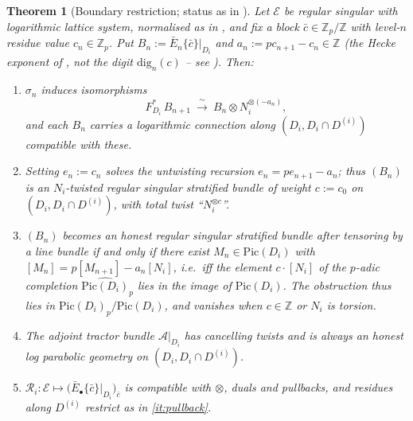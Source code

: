 \documentclass[11pt,reqno]{amsart}
\newcommand{\Zp}{\mathbb{Z}_p}
\newcommand{\ZZ}{\mathbb{Z}}
\newcommand{\cE}{\mathcal{E}}
\newcommand{\cA}{\mathcal{A}}
\newcommand{\cR}{\mathcal{R}}
\newcommand{\Pic}{\mathrm{Pic}}
\newcommand{\dig}{\mathrm{dig}}
\newcommand{\isoto}{\xrightarrow{\ \sim\ }}
\theoremstyle{plain}
\newtheorem{theorem}{Theorem}[section]
\theoremstyle{definition}
\theoremstyle{remark}
\numberwithin{equation}{section}
\begin{document}
\begin{theorem}[Boundary restriction; status as in
]\label{thm:boundary}
Let $\cE$ be regular singular with logarithmic lattice system, normalised
as in , and fix a block $\bar c\in\Zp/\ZZ$ with
level-$n$ residue value $c_n\in\Zp$.  Put $B_n:=\bar E_n\{\bar c\}|_{D_i}$
and $a_n:=pc_{n+1}-c_n\in\ZZ$ (the Hecke exponent of
, \emph{not} the digit $\dig_n(c)$ -- see
). Then:
\begin{enumerate}
\item $\sigma_n$ induces isomorphisms
\[
   F_{D_i}^*\,B_{n+1}\ \isoto\ B_n\otimes N_i^{\otimes(-a_n)} ,
\]
and each $B_n$ carries a logarithmic connection along
$(D_i,D_i\cap D^{(i)})$ compatible with these.
\item Setting $e_n:=c_n$ solves the untwisting recursion
      $e_n=pe_{n+1}-a_n$; thus $(B_n)$ is an \emph{$N_i$-twisted regular
      singular stratified bundle of weight $c:=c_0$} on
      $(D_i,D_i\cap D^{(i)})$, with total twist ``$N_i^{\otimes c}$''.
\item $(B_n)$ becomes an honest regular singular stratified bundle after
      tensoring by a line bundle if and only if there exist
      $M_n\in\Pic(D_i)$ with $[M_n]=p[M_{n+1}]-a_n[N_i]$, i.e.\ iff the
      element $c\cdot[N_i]$ of the $p$-adic completion
      $\widehat{\Pic(D_i)}_p$ lies in the image of $\Pic(D_i)$.  The
      obstruction thus lies in $\widehat{\Pic(D_i)}_p/\Pic(D_i)$, and
      vanishes when $c\in\ZZ$ or $N_i$ is torsion.
\item The adjoint tractor bundle $\cA|_{D_i}$ has cancelling twists and is
      always an honest log parabolic geometry on
      $(D_i,D_i\cap D^{(i)})$.
\item $\cR_i\colon\cE\mapsto\bigl(\bar E_\bullet\{\bar c\}|_{D_i}\bigr)_{\bar c}$
      is compatible with $\otimes$, duals and pullbacks, and residues along
      $D^{(i)}$ restrict as in
      \eqref{it:pullback}.
\end{enumerate}
\end{theorem}
\end{document}
